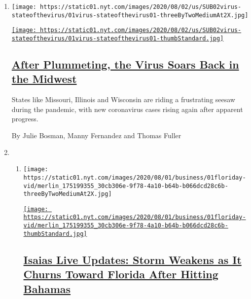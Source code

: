 \begin{enumerate}
\def\labelenumi{\arabic{enumi}.}
\item
  \texttt{[image: https://static01.nyt.com/images/2020/08/02/us/SUB02virus-stateofthevirus/01virus-stateofthevirus01-threeByTwoMediumAt2X.jpg]}

  \href{/2020/08/01/us/coronavirus-midwest-cases-deaths.html}{\texttt{[image: https://static01.nyt.com/images/2020/08/02/us/SUB02virus-stateofthevirus/01virus-stateofthevirus01-thumbStandard.jpg]}}

  \hypertarget{after-plummeting-the-virus-soars-back-in-the-midwest}{%
  \subsection{\texorpdfstring{\href{/2020/08/01/us/coronavirus-midwest-cases-deaths.html}{After
  Plummeting, the Virus Soars Back in the
  Midwest}}{After Plummeting, the Virus Soars Back in the Midwest}}\label{after-plummeting-the-virus-soars-back-in-the-midwest}}

  States like Missouri, Illinois and Wisconsin are riding a frustrating
  seesaw during the pandemic, with new coronavirus cases rising again
  after apparent progress.

  By Julie Bosman, Manny Fernandez and Thomas Fuller
\item
  \begin{enumerate}
  \def\labelenumii{\arabic{enumii}.}
  \item
    \texttt{[image: https://static01.nyt.com/images/2020/08/01/business/01floriday-vid/merlin\_175199355\_30cb306e-9f78-4a10-b64b-b066dcd28c6b-threeByTwoMediumAt2X.jpg]}

    \href{/2020/08/01/us/hurricane-isaias-track.html}{\texttt{[image: https://static01.nyt.com/images/2020/08/01/business/01floriday-vid/merlin\_175199355\_30cb306e-9f78-4a10-b64b-b066dcd28c6b-thumbStandard.jpg]}}

    \hypertarget{isaias-live-updates-storm-weakens-as-it-churns-toward-florida-after-hitting-bahamas}{%
    \subsection{\texorpdfstring{\href{/2020/08/01/us/hurricane-isaias-track.html}{Isaias
    Live Updates: Storm Weakens as It Churns Toward Florida After
    Hitting
    Bahamas}}{Isaias Live Updates: Storm Weakens as It Churns Toward Florida After Hitting Bahamas}}\label{isaias-live-updates-storm-weakens-as-it-churns-toward-florida-after-hitting-bahamas}}


\end{enumerate}
\end{enumerate}
